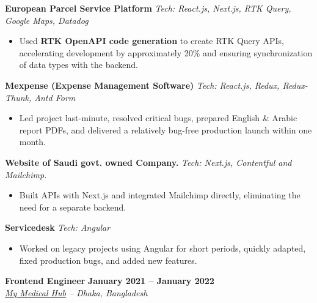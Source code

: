\documentclass[11pt,a4paper]{article}
\newcommand{\role}[4]{
    \noindent\textbf{\large #1} \hfill \textbf{#2} \\
    \textit{#3} \hfill \textit{#4}
    \vspace{2pt}
}
\newcommand{\project}[2]{
    \noindent\textbf{#1} \hfill \textit{Tech: #2}
    \vspace{1pt}
}
\begin{document}
\vspace{4pt}

\vspace{1pt}

\project{European Parcel Service Platform}{React.js, Next.js, RTK Query, Google Maps, Datadog}
\begin{itemize}[leftmargin=16pt, nosep]
    \item Used \textbf{RTK OpenAPI code generation} to create RTK Query APIs, accelerating development by approximately 20\% and ensuring synchronization of data types with the backend.
\end{itemize}

\vspace{3pt}

\project{Mexpense (Expense Management Software)}{React.js, Redux, Redux-Thunk, Antd Form}
\begin{itemize}[leftmargin=16pt, nosep]
    \item Led project last-minute, resolved critical bugs, prepared English \& Arabic report PDFs, and delivered a relatively bug-free production launch within one month.
\end{itemize}

\vspace{3pt}

\project{Website of Saudi govt. owned Company.}{Next.js, Contentful and Mailchimp.}
\begin{itemize}[leftmargin=16pt, nosep]
    \item Built APIs with Next.js and integrated Mailchimp directly, eliminating the need for a separate backend.
\end{itemize}

\vspace{3pt}

\project{Servicedesk}{Angular}
\begin{itemize}[leftmargin=16pt, nosep]
    \item Worked on legacy projects using Angular for short periods, quickly adapted, fixed production bugs, and added new features.
\end{itemize}

\vspace{4pt}

\role{Frontend Engineer}{January 2021 -- January 2022}{\href{https://mymedicalhub.com}{My Medical Hub} -- Dhaka, Bangladesh}{}
\end{document}
